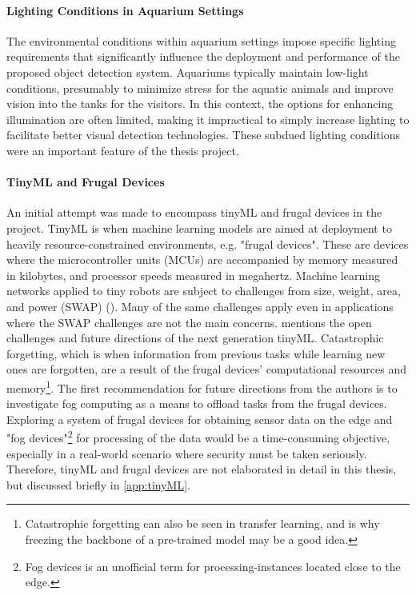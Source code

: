 \paragraph{Lighting Conditions in Aquarium Settings}
\label{sec:scope_aquarium_light}
The environmental conditions within aquarium settings impose specific lighting requirements that significantly influence the deployment and performance of the proposed object detection system. Aquariums typically maintain low-light conditions, presumably to minimize stress for the aquatic animals and improve vision into the tanks for the visitors. In this context, the options for enhancing illumination are often limited, making it impractical to simply increase lighting to facilitate better visual detection technologies. These subdued lighting conditions were an important feature of the thesis project.

\paragraph{TinyML and Frugal Devices}
\label{sec:scope_tinyML}
An initial attempt was made to encompass tinyML and frugal devices in the project. TinyML is when machine learning models are aimed at deployment to heavily resource-constrained environments, e.g. "frugal devices". These are devices where the microcontroller units (MCUs) are accompanied by memory measured in kilobytes, and processor speeds measured in megahertz. Machine learning networks applied to tiny robots are subject to challenges from size, weight, area, and power (SWAP) (\cite{ne2022robotstinymlconstraints}). Many of the same challenges apply even in applications where the SWAP challenges are not the main concerns. \citeauthor{ra2023reformabletinyml} mentions the open challenges and future directions of the next generation tinyML. Catastrophic forgetting, which is when information from previous tasks while learning new ones are forgotten, are a result of the frugal devices' computational resources and memory\footnote{Catastrophic forgetting can also be seen in transfer learning, and is why freezing the backbone of a pre-trained model may be a good idea.}. The first recommendation for future directions from the authors is to investigate fog computing as a means to offload tasks from the frugal devices. Exploring a system of frugal devices for obtaining sensor data on the edge and "fog devices"\footnote{Fog devices is an unofficial term for processing-instances located close to the edge.} for processing of the data would be a time-consuming objective, especially in a real-world scenario where security must be taken seriously. Therefore, tinyML and frugal devices are not elaborated in detail in this thesis, but discussed briefly in \ref{app:tinyML}. 

